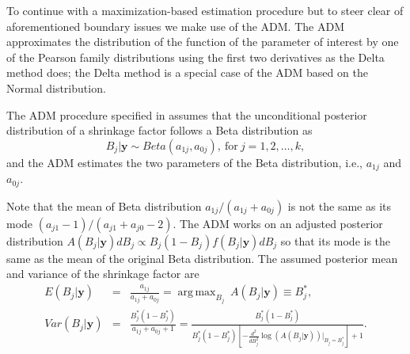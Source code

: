 \documentclass[article]{jss}
\DeclareMathOperator*{\argmax}{arg\,max}
\begin{document}
To continue with a maximization-based estimation procedure but to steer clear of aforementioned boundary issues we make use of the ADM. The ADM approximates the distribution of the function of the parameter of interest by one of the Pearson family distributions using the first two derivatives as the Delta method does; the Delta method is a special case of the ADM based on the Normal distribution. 


The ADM procedure specified in \cite{tang2011} assumes that the unconditional posterior distribution of a shrinkage factor follows a Beta distribution as
\begin{equation}\label{admshrinkage}
B_j\vert\boldsymbol{y}\sim Beta(a_{1j}, a_{0j}), ~\textrm{for}~j=1, 2, \ldots, k,
\end{equation}
and the ADM estimates the two parameters of the Beta distribution, i.e., $a_{1j}$ and $a_{0j}$.


Note that the mean of Beta distribution $a_{1j}/(a_{1j}+a_{0j})$ is not the same as its mode $(a_{j1}-1)/(a_{j1}+a_{j0}-2)$. The ADM works on an adjusted posterior distribution $A(B_j\vert \boldsymbol{y})dB_j\propto B_j(1-B_j)f(B_j\vert \boldsymbol{y})dB_j$ so that its mode is the same as the mean of the original Beta distribution. The assumed posterior mean and variance of the shrinkage factor are
\begin{eqnarray}
E(B_j\vert\boldsymbol{y})&=&\frac{a_{1j}}{a_{1j}+a_{0j}}=\argmax_{B_j}~ A(B_j\vert \boldsymbol{y})\equiv B^\ast_j,\label{admmean}\\
Var(B_j\vert\boldsymbol{y})&=&\frac{B^\ast_j(1-B^\ast_j)}{a_{1j}+a_{0j}+1}=\frac{B^\ast_j(1-B^\ast_j)}{B^\ast_j(1-B^\ast_j)[-\frac{d^2}{dB^2_j}\log(A(B_j\vert \boldsymbol{y}))\vert_{B_j=B^\ast_j}] +1}.\label{admvar}
\end{eqnarray}
\end{document}
